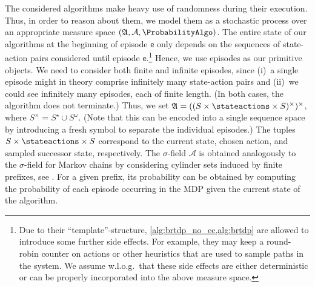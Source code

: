 \documentclass{article}
\newcommand{\unionSym}{\cup}
\newcommand{\unionBin}{\mathbin{\unionSym}}
\newcommand{\union}{\unionBin}
\newcommand{\States}{S}
\newcommand{\algoepisode}{\mathsf{e}}
\newcommand{\algorithmspace}{\mathfrak{A}}
\newcommand{\algorithmsigma}{\mathcal{A}}
\begin{document}
The considered algorithms make heavy use of randomness during their execution.
Thus, in order to reason about them, we model them as a stochastic process over an appropriate measure space $(\algorithmspace, \algorithmsigma, \ProbabilityAlgo)$.
The entire state of our algorithms at the beginning of episode $\algoepisode$ only depends on the sequences of state-action pairs considered until episode $\algoepisode$.\footnote{Due to their \enquote{template}-structure, \cref{alg:brtdp_no_ec,alg:brtdp} are allowed to introduce some further side effects.
For example, they may keep a round-robin counter on actions or other heuristics that are used to sample paths in the system.
We assume w.l.o.g.\ that these side effects are either deterministic or can be properly incorporated into the above measure space.}
Hence, we use episodes as our primitive objects.
We need to consider both finite and infinite episodes, since (i)~a single episode might in theory comprise infinitely many state-action pairs and (ii)~we could see infinitely many episodes, each of finite length.
(In both cases, the algorithm does not terminate.)
Thus, we set $\algorithmspace = ((\States \times \stateactions \times \States)^\times)^\times$, where $S^\times = S^\star \union S^\omega$.
(Note that this can be encoded into a single sequence space by introducing a fresh symbol to separate the individual episodes.)
The tuples $\States \times \stateactions \times \States$ correspond to the current state, chosen action, and sampled successor state, respectively.
The $\sigma$-field $\algorithmsigma$ is obtained analogously to the $\sigma$-field for Markov chains by considering cylinder sets induced by finite prefixes, see \cite[Section~2.1.6]{DBLP:books/wi/Puterman94}.
For a given prefix, its probability can be obtained by computing the probability of each episode occurring in the MDP given the current state of the algorithm.
\end{document}
